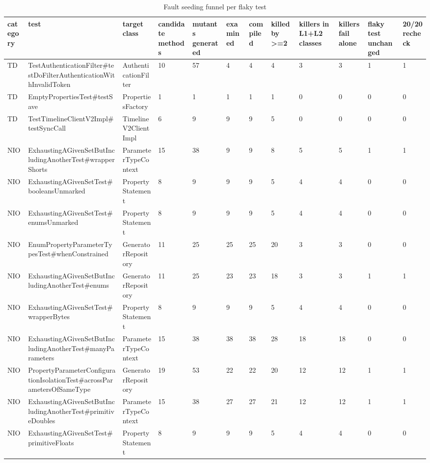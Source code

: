 \begin{table}[t]
\centering\small
\caption{Fault seeding funnel per flaky test}
\label{tab:mutant_funnel}
\begin{tabular}{llllllllllll}
\toprule
\textbf{category} & \textbf{test} & \textbf{target class} & \textbf{candidate methods} & \textbf{mutants generated} & \textbf{examined} & \textbf{compiled} & \textbf{killed by >=2} & \textbf{killers in L1+L2 classes} & \textbf{killers fail alone} & \textbf{flaky test unchanged} & \textbf{20/20 recheck} \\
\midrule
TD & TestAuthenticationFilter\#testDoFilterAuthenticationWithInvalidToken & AuthenticationFilter & 10 & 57 & 4 & 4 & 4 & 3 & 3 & 1 & 1 \\
TD & EmptyPropertiesTest\#testSave & PropertiesFactory & 1 & 1 & 1 & 1 & 1 & 0 & 0 & 0 & 0 \\
TD & TestTimelineClientV2Impl\#testSyncCall & TimelineV2ClientImpl & 6 & 9 & 9 & 9 & 5 & 0 & 0 & 0 & 0 \\
NIO & ExhaustingAGivenSetButIncludingAnotherTest\#wrapperShorts & ParameterTypeContext & 15 & 38 & 9 & 9 & 8 & 5 & 5 & 1 & 1 \\
NIO & ExhaustingAGivenSetTest\#booleansUnmarked & PropertyStatement & 8 & 9 & 9 & 9 & 5 & 4 & 4 & 0 & 0 \\
NIO & ExhaustingAGivenSetTest\#enumsUnmarked & PropertyStatement & 8 & 9 & 9 & 9 & 5 & 4 & 4 & 0 & 0 \\
NIO & EnumPropertyParameterTypesTest\#whenConstrained & GeneratorRepository & 11 & 25 & 25 & 25 & 20 & 3 & 3 & 0 & 0 \\
NIO & ExhaustingAGivenSetButIncludingAnotherTest\#enums & GeneratorRepository & 11 & 25 & 23 & 23 & 18 & 3 & 3 & 1 & 1 \\
NIO & ExhaustingAGivenSetTest\#wrapperBytes & PropertyStatement & 8 & 9 & 9 & 9 & 5 & 4 & 4 & 0 & 0 \\
NIO & ExhaustingAGivenSetButIncludingAnotherTest\#manyParameters & ParameterTypeContext & 15 & 38 & 38 & 38 & 28 & 18 & 18 & 0 & 0 \\
NIO & PropertyParameterConfigurationIsolationTest\#acrossParametersOfSameType & GeneratorRepository & 19 & 53 & 22 & 22 & 20 & 12 & 12 & 1 & 1 \\
NIO & ExhaustingAGivenSetButIncludingAnotherTest\#primitiveDoubles & ParameterTypeContext & 15 & 38 & 27 & 27 & 21 & 12 & 12 & 1 & 1 \\
NIO & ExhaustingAGivenSetTest\#primitiveFloats & PropertyStatement & 8 & 9 & 9 & 9 & 5 & 4 & 4 & 0 & 0 \\

\end{tabular}
\end{table}
